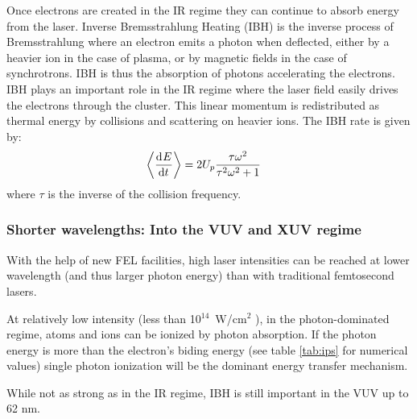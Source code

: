 
Once electrons are created in the IR regime they can continue to absorb energy
from the laser.
Inverse Bremsstrahlung Heating (IBH) is the inverse process of Bremsstrahlung
where an electron emits a photon when deflected, either by a heavier ion in the
case of plasma, or by magnetic fields in the case of synchrotrons. IBH is thus
the absorption of photons accelerating the electrons\cite{Schlessinger1979}.
IBH plays an important role in the IR regime where the laser field easily
drives the electrons through the cluster\cite{Fennel2010}.
%
%
This linear momentum
is redistributed as thermal energy by collisions and scattering on heavier ions.
The IBH rate is given\cite{Fennel2010} by:
\begin{align}
\left< \frac{\textrm{d}^{{}} {E}}{\textrm{d} t^{{}}} \right> & = 2 U_p \frac{\tau \omega^2}{\tau^2 \omega^2 + 1}
\end{align}
where $\tau$ is the inverse of the collision frequency.


\subsubsection{Shorter wavelengths: Into the VUV and XUV regime}
\label{section:intro:mechanisms:vuv}

With the help of new FEL facilities, high laser intensities can be reached at
lower wavelength (and thus larger photon energy) than with traditional
femtosecond lasers.

At relatively low intensity (less than 10$^{14}$~W/cm$^2$
\cite{Ramunno2008}), in the photon-dominated regime, atoms and ions
can be ionized by photon absorption. If the photon energy is more than the
electron's biding energy (see table \ref{tab:ips} for numerical values) single
photon ionization will be the dominant energy transfer mechanism.

While not as strong as in the IR regime, IBH is still important in the
VUV\cite{Krainov2000} up to 62 nm\cite{Georgescu2007}.



